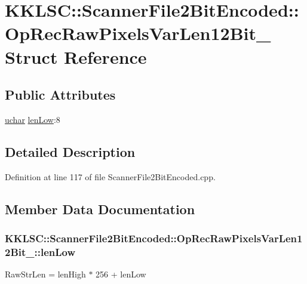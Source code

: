 \hypertarget{struct_scanner_file2_bit_encoded_1_1_op_rec_raw_pixels_var_len12_bit__2}{}\section{K\+K\+L\+SC\+:\+:Scanner\+File2\+Bit\+Encoded\+:\+:Op\+Rec\+Raw\+Pixels\+Var\+Len12\+Bit\+\_ Struct Reference}
\label{struct_scanner_file2_bit_encoded_1_1_op_rec_raw_pixels_var_len12_bit__2}
\subsection*{Public Attributes}
\begin{DoxyCompactItemize}
\item 
\hyperlink{namespace_k_k_b_ace9969169bf514f9ee6185186949cdf7}{uchar} \hyperlink{struct_scanner_file2_bit_encoded_1_1_op_rec_raw_pixels_var_len12_bit__2_af0e7992577e3fc899ab65e7747ac97d7}{len\+Low}\+:8
\end{DoxyCompactItemize}


\subsection{Detailed Description}


Definition at line 117 of file Scanner\+File2\+Bit\+Encoded.\+cpp.



\subsection{Member Data Documentation}
\subsubsection[{\texorpdfstring{len\+Low}{lenLow}}]{ K\+K\+L\+S\+C\+::\+Scanner\+File2\+Bit\+Encoded\+::\+Op\+Rec\+Raw\+Pixels\+Var\+Len12\+Bit\+\_\+::len\+Low}\hypertarget{struct_scanner_file2_bit_encoded_1_1_op_rec_raw_pixels_var_len12_bit__2_af0e7992577e3fc899ab65e7747ac97d7}{}\label{struct_scanner_file2_bit_encoded_1_1_op_rec_raw_pixels_var_len12_bit__2_af0e7992577e3fc899ab65e7747ac97d7}
Raw\+Str\+Len = len\+High $\ast$ 256 + len\+Low 

